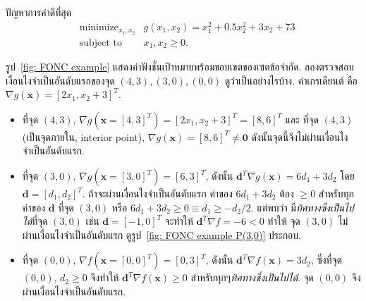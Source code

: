 \begin{myexample}
ปัญหาการค่าดีที่สุด
\begin{eqnarray}
  & \mbox{minimize}_{x_1, x_2} & 
     g(x_1, x_2) = x_1^2 + 0.5 x_2^2 + 3 x_2 + 73 
     \nonumber \\
  & \mbox{subject to } &
     x_1, x_2 \geq 0.
     \nonumber
\end{eqnarray}

รูป~\ref{fig: FONC example} แสดงค่าฟังชั่นเป้าหมายพร้อมขอบเขตของเซตข้อจำกัด.
ลองตรวจสอบเงื่อนไงจำเป็นอันดับแรกของจุด $(4,3), (3,0), (0,0)$ ดูว่าเป็นอย่างไรบ้าง.
ค่าเกรเดียนต์ คือ $\nabla g(\mathbf{x}) = [2 x_1 , x_2 + 3]^T$.
\begin{itemize}
\item ที่จุด $(4,3)$, $\nabla g(\mathbf{x} = [4,3]^T) = [2 x_1 , x_2 + 3]^T = [8, 6]^T$ และ ที่จุด $(4,3)$ (เป็นจุดภายใน, interior point), $\nabla g(\mathbf{x}) = [8, 6]^T \neq \mathbf{0}$  ดังนั้นจุดนี้จึงไม่ผ่านเงื่อนไงจำเป็นอันดับแรก.

\item ที่จุด $(3,0)$, $\nabla g(\mathbf{x} = [3,0]^T) = [6,3]^T$,
ดังนั้น $\mathbf{d}^T \nabla g(\mathbf{x}) = 6 d_1 + 3 d_2$ 
โดย $\mathbf{d} = [d_1, d_2]^T$.
ถ้าจะผ่านเงื่อนไงจำเป็นอันดับแรก ค่าของ $6 d_1 + 3 d_2$ ต้อง $\geq 0$ สำหรับทุกค่าของ $\mathbf{d}$ ที่จุด $(3,0)$ หรือ $6 d_1 + 3 d_2 \geq 0 \equiv d_1 \geq - d_2/2$.
แต่พบว่า มี\textit{ทิศทางซึ่งเป็นไปได้}ที่จุด $(3,0)$ 
เช่น $\mathbf{d} = [-1,0]^T$ จะทำให้ $\mathbf{d}^T \nabla f = -6 < 0$
ทำให้ จุด $(3,0)$ ไม่ผ่านเงื่อนไงจำเป็นอันดับแรก
ดูรูป~\ref{fig: FONC example P(3,0)} ประกอบ. %

\item ที่จุด $(0,0)$, $\nabla f(\mathbf{x} = [0,0]^T) = [0,3]^T$,
ดังนั้น $\mathbf{d}^T \nabla f(\mathbf{x}) = 3 d_2$, 
ซึ่งที่จุด $(0,0)$, $d_2 \geq 0$ จึงทำให้ $\mathbf{d}^T \nabla f(\mathbf{x}) \geq 0$ สำหรับทุกๆ\textit{ทิศทางซึ่งเป็นไปได้}.
จุด $(0,0)$ จึงผ่านเงื่อนไงจำเป็นอันดับแรก.
\end{itemize}

\end{myexample}

